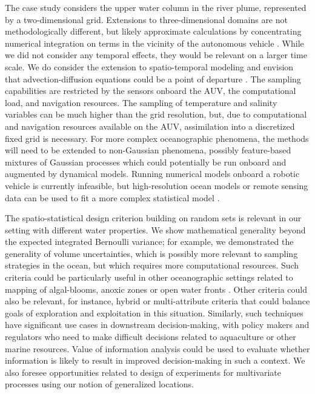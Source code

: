 \documentclass[aoas]{imsart}
\begin{document}
The case study considers the upper water column in the river plume,
represented by a two-dimensional grid. Extensions to three-dimensional
domains are not methodologically different, but likely approximate
calculations by concentrating numerical integration on terms in the
vicinity of the autonomous vehicle \citep{fossum18b}. While we did not
consider any temporal effects, they would be relevant on a larger
time scale. We do consider the extension to spatio-temporal modeling
and envision that advection-diffusion equations could be a point of departure
\citep{sigrist2015stochastic,richardson2017sparsity}. The sampling
capabilities are restricted by the sensors onboard the AUV, the
computational load, and navigation resources. The sampling of
temperature and salinity variables can be much higher than the grid
resolution, but, due to computational and navigation resources
available on the AUV, assimilation into a discretized fixed grid is
necessary. For more complex oceanographic phenomena, the methods will
need to be extended to non-Gaussian phenomena, possibly feature-based
mixtures of Gaussian processes which could potentially be run onboard and
augmented by dynamical models. Running numerical models onboard a
robotic vehicle is currently infeasible, but high-resolution ocean
models or remote sensing data can be used to fit a more complex
statistical model \citep{davidson19}.

The spatio-statistical design criterion building on random sets is
relevant in our setting with different water properties. We show mathematical generality beyond the expected integrated Bernoulli variance; for example, we demonstrated the generality of volume uncertainties, which is possibly more relevant to sampling strategies in the ocean, but which requires more computational resources.
Such criteria could be particularly useful in other oceanographic
settings related to mapping of algal-blooms, anoxic zones or open
water fronts \citep{costa19}.  Other criteria could also be relevant,
for instance, hybrid or multi-attribute criteria that could balance
goals of exploration and exploitation in this situation. Similarly, such
techniques have significant use cases in downstream decision-making,
with policy makers and regulators who need to make difficult decisions
related to aquaculture or other marine resources. Value of information
analysis \citep{Eidsvik:15} could be used to evaluate whether
information is likely to result in improved decision-making in such a
context.  We also foresee opportunities related to design of
experiments for multivariate processes using our notion of generalized
locations.
\end{document}
